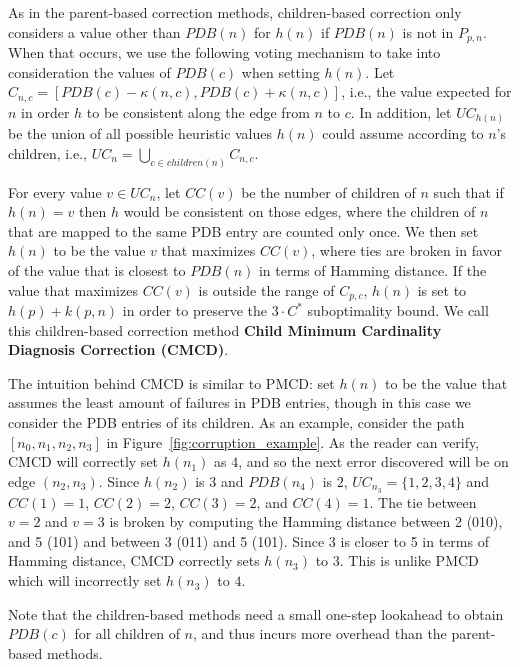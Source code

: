 \documentclass[letterpaper]{article}
\newtheorem{example}{Example}
\begin{document}
As in the parent-based correction methods, children-based correction only considers a value other than $PDB(n)$ for $h(n)$ if $PDB(n)$ is not in $P_{p,n}$. When that occurs, we use the following voting mechanism to take into consideration the values of $PDB(c)$ when setting $h(n)$.
Let $C_{n,c}=[PDB(c)-\kappa(n,c),PDB(c)+\kappa(n,c)]$, i.e., the value expected for $n$ in order $h$ to be consistent along the edge from $n$ to $c$. In addition, let $UC_{h(n)}$ be the union of all possible heuristic values $h(n)$ could assume according to $n$'s children, i.e., $UC_n = \bigcup_{c \in children(n)} C_{n,c}$.

For every value $v\in UC_n$, let $CC(v)$ be the number of children of $n$ such that if $h(n)=v$ then $h$ would be consistent on those edges, where the children of $n$ that are mapped to the same PDB entry are counted only once. We then set $h(n)$ to be the value $v$ that maximizes $CC(v)$, where ties are broken in favor of the value that is closest to $PDB(n)$ in terms of Hamming distance.
If the value that maximizes $CC(v)$ is outside the range of $C_{p,c}$, $h(n)$ is set to $h(p) + k(p, n)$ in order to preserve the $3 \cdot C^*$ suboptimality bound.
We call this children-based correction method \textbf{Child Minimum Cardinality Diagnosis Correction (CMCD)}.

The intuition behind CMCD is similar to PMCD: set $h(n)$ to be the value that assumes the least amount of failures in PDB entries, though in this case we consider the PDB entries of its children.
As an example, consider the path $[n_0, n_1, n_2, n_3]$ in Figure~\ref{fig:corruption_example}.
As the reader can verify, CMCD will correctly set $h(n_1)$ as $4$, and so the next error discovered will be on edge $(n_2, n_3)$.
Since $h(n_2)$ is $3$  and $PDB(n_4)$ is $2$, $UC_{n_3} = \{1, 2, 3, 4\}$ and $CC(1)=1$, $CC(2)=2$, $CC(3)=2$, and $CC(4)=1$.
The tie between $v=2$ and $v=3$ is broken by computing the Hamming distance between 2 (010), and 5 (101) and between 3 (011) and 5 (101). Since 3 is closer to 5 in terms of Hamming distance, CMCD correctly sets $h(n_3)$ to $3$.
This is unlike PMCD which will incorrectly set $h(n_3)$ to $4$.

Note that the children-based methods need a small one-step lookahead to obtain $PDB(c)$ for all children of $n$, and thus incurs more overhead than the parent-based methods.
\end{document}
